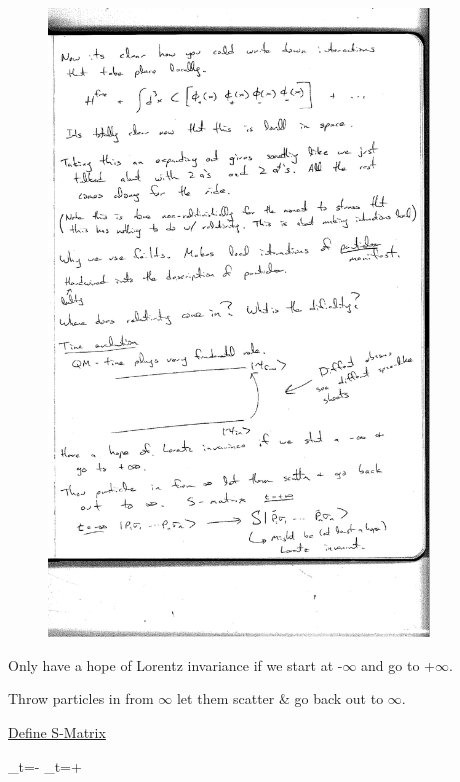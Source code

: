 {\begin{figure}[h]
\centering
\includegraphics[width=0.9\textwidth]{./TimeEvolution.pdf}
\end{figure}

Only have a hope of Lorentz invariance if we start at -$\infty$ and go to +$\infty$.

Throw particles in from $\infty$ let them scatter \& go back out to $\infty$.

\underline{Define S-Matrix}

\be
{}_{t=-\infty} \rightarrow {}_{t=+\infty}
\ee

}



